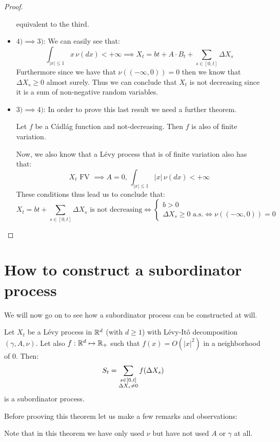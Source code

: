 \begin{proof}
\begin{itemize}
    equivalent to the third.
    \item $4) \implies 3)$: We can easily see that:
    \[ \int_{|x|\leq1} x \, \nu(dx) < +\infty \implies
    X_t = bt + A\cdot B_t + \sum_{s\in[0,t]} \Delta X_s \]
    Furthermore since we have that $\nu((-\infty, 0)) = 0$ then we know that
    $\Delta X_s \geq 0$ almost surely. Thus we can conclude that $X_t$ is not
    decreasing since it is a sum of non-negative random variables.
    \item $3) \implies 4)$: In order to prove this last result we need a
    further theorem.
    \begin{theorem*}
        Let $f$ be a C\'adl\'ag function and not-decreasing. Then $f$ is also
        of finite variation.
    \end{theorem*}
    Now, we also know that a L\'evy process that is of finite variation also has
    that:
    \[ X_t \text{ FV } \implies A=0, \, \int_{|x|\leq1} |x| \, \nu(dx) < +\infty
    \]
    These conditions thus lead us to conclude that:
    \[ X_t = bt + \sum_{s\in[0,t]} \Delta X_s \text{ is not decreasing} \iff
        \left\{ \begin{array}{l}
            b > 0 \\ \Delta X_s \geq 0 \text{ a.s.} \iff \nu((-\infty, 0)) = 0
        \end{array} \right.
    \]
\end{itemize}
\end{proof}

\section{How to construct a subordinator process}
We will now go on to see how a subordinator process can be constructed at will.

\begin{theorem}
Let $X_t$ be a L\'evy process in $\mathbb{R}^d$ (with $d\geq1$) with L\'evy-It\^o
decomposition $(\gamma, A, \nu)$. Let also $f:\mathbb{R}^d\mapsto\mathbb{R}_{+}$ such that $f(x) = 
O(|x|^2)$ in a neighborhood of $0$. Then:
\[ S_t = \sum_{\begin{subarray}{c} s\in[0,t] \\ \Delta X_s \neq 0 \end{subarray}}
    f(\Delta X_s) \]
is a subordinator process.
\end{theorem}

Before prooving this theorem let us make a few remarks and observations:

\begin{remark*}
Note that in this theorem we have only used $\nu$ but have not used $A$ or
$\gamma$ at all.
\end{remark*}

